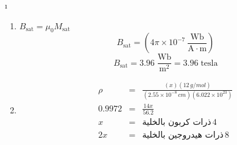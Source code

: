 \begin {corrige}[\thechapter ]{\i }
\hfill
 \begin{enumerate}
 \item
 $B_{\mathrm{sat}}=\mu_0 M_{\mathrm{sat}}$
$$B_{\mathrm{sat}}=\left(   4\pi\times10^{-7}\:\mathrm{\frac{Wb}{A\cdot m}}\right) $$
$$B_{\mathrm{sat}}=3.96\;\mathrm{\frac{Wb}{m^2}}=3.96\;\mathrm{tesla}$$
 \item
  \begin{eqnarray*}
 \rho&=&\frac{(x)(12\,{g/mol})}{(2.55\times10^{-8}\,{cm})(6.022\times10^{23})}\\
 0.9972&=&\frac{14x}{56.2}\\
 x&=&\text{
 ذرات كربون بالخلية}\,4
 \\
2  x&=&\text{ذرات هيدروجين بالخلية}\,8
 \end{eqnarray*}
 \end{enumerate}
\end {corrige}\par \vspace *{\spacebeforeexo }
